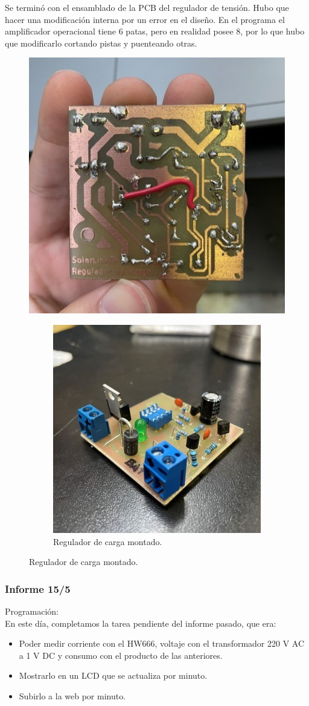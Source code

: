 Se terminó con el ensamblado de la PCB del regulador de tensión. Hubo que hacer una modificación interna por un error en el diseño. En el programa el amplificador operacional tiene 6 patas, pero en realidad posee 8, por lo que hubo que modificarlo cortando pistas y puenteando otras.
\begin{figure}[H]
    \centering
    \includegraphics[width=0.5\linewidth]{informes/IMG_8085.jpg}
    \caption{Regulador de carga modificado.}

\begin{figure}[H]
    \centering
    \includegraphics[width=0.5\linewidth]{informes/IMG_8084.jpg}
    \caption{Regulador de carga montado.}
\end{figure}
    
\end{figure}

\subsubsection{Informe 15/5}

Programación:\\

En este día, completamos la tarea pendiente del informe pasado, que era:\\
\begin{itemize}
\item Poder medir corriente con el HW666, voltaje con el transformador 220 V AC a 1 V DC y consumo con el producto de las anteriores.
\item Mostrarlo en un LCD que se actualiza por minuto.
\item Subirlo a la web por minuto.

\end{itemize}

